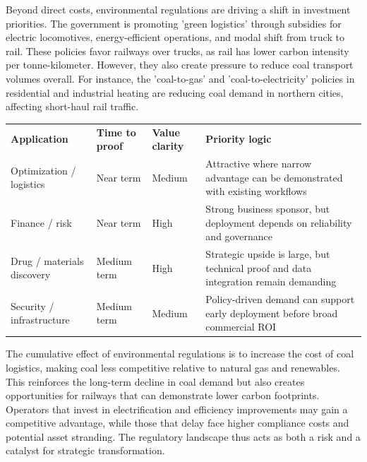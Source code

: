 \documentclass[10pt,a4paper]{article}
\begin{document}
{\small Beyond direct costs, environmental regulations are driving a shift in investment priorities. The government is promoting 'green logistics' through subsidies for electric locomotives, energy-efficient operations, and modal shift from truck to rail. These policies favor railways over trucks, as rail has lower carbon intensity per tonne-kilometer. However, they also create pressure to reduce coal transport volumes overall. For instance, the 'coal-to-gas' and 'coal-to-electricity' policies in residential and industrial heating are reducing coal demand in northern cities, affecting short-haul rail traffic.}
\vspace{3pt}\noindent{}\vspace{4pt}

\vspace{4pt}{\textcolor{BOBlue}{\scriptsize\bfseries APPLICATION ATTRACTIVENESS SCREEN}}\par
\begin{tabularx}{\linewidth}{p{36mm}p{27mm}p{27mm}Y}
\textcolor{BOBlue}{\bfseries Application} & \textcolor{BOBlue}{\bfseries Time to proof} & \textcolor{BOBlue}{\bfseries Value clarity} & \textcolor{BOBlue}{\bfseries Priority logic} \\
Optimization / logistics & Near term & Medium & Attractive where narrow advantage can be demonstrated with existing workflows \\
Finance / risk & Near term & High & Strong business sponsor, but deployment depends on reliability and governance \\
Drug / materials discovery & Medium term & High & Strategic upside is large, but technical proof and data integration remain demanding \\
Security / infrastructure & Medium term & Medium & Policy-driven demand can support early deployment before broad commercial ROI \\
\end{tabularx}

{\small {\small The cumulative effect of environmental regulations is to increase the cost of coal logistics, making coal less competitive relative to natural gas and renewables. This reinforces the long-term decline in coal demand but also creates opportunities for railways that can demonstrate lower carbon footprints. Operators that invest in electrification and efficiency improvements may gain a competitive advantage, while those that delay face higher compliance costs and potential asset stranding. The regulatory landscape thus acts as both a risk and a catalyst for strategic transformation.}}
\end{document}
